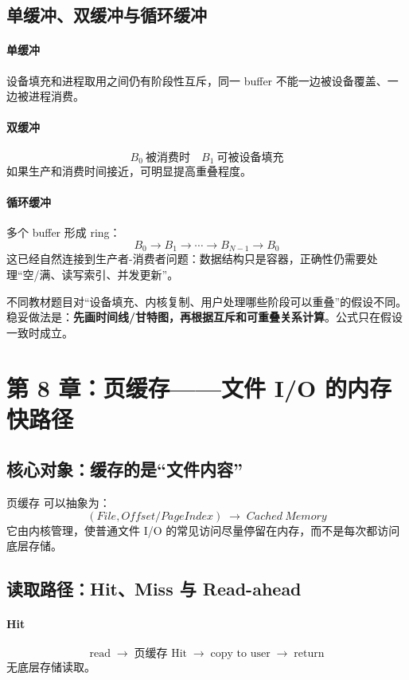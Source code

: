 \documentclass[11pt,a4paper]{ctexart}
\newcommand{\kw}[1]{\textbf{#1}}
\newcommand{\arr}{\;\longrightarrow\;}
\begin{document}
\subsection{单缓冲、双缓冲与循环缓冲}
\paragraph{单缓冲}
设备填充和进程取用之间仍有阶段性互斥，同一 buffer 不能一边被设备覆盖、一边被进程消费。

\paragraph{双缓冲}
\[
B_0\ \text{被消费时}\quad B_1\ \text{可被设备填充}
\]
如果生产和消费时间接近，可明显提高重叠程度。

\paragraph{循环缓冲}
多个 buffer 形成 ring：
\[
B_0\to B_1\to\cdots\to B_{N-1}\to B_0
\]
这已经自然连接到生产者-消费者问题：数据结构只是容器，正确性仍需要处理“空/满、读写索引、并发更新”。

\begin{exam}[缓冲题不要死背总时间公式]
不同教材题目对“设备填充、内核复制、用户处理哪些阶段可以重叠”的假设不同。稳妥做法是：\kw{先画时间线/甘特图，再根据互斥和可重叠关系计算}。公式只在假设一致时成立。
\end{exam}

\section{第 8 章：页缓存——文件 I/O 的内存 快路径}

\subsection{核心对象：缓存的是“文件内容”}
页缓存 可以抽象为：
\[
\boxed{(File,Offset/PageIndex)\arr Cached\ Memory}
\]
它由内核管理，使普通文件 I/O 的常见访问尽量停留在内存，而不是每次都访问底层存储。

\subsection{读取路径：Hit、Miss 与 Read-ahead}
\paragraph{Hit}
\[
\text{read}\arr\text{页缓存 Hit}\arr\text{copy to user}\arr\text{return}
\]
无底层存储读取。
\end{document}
